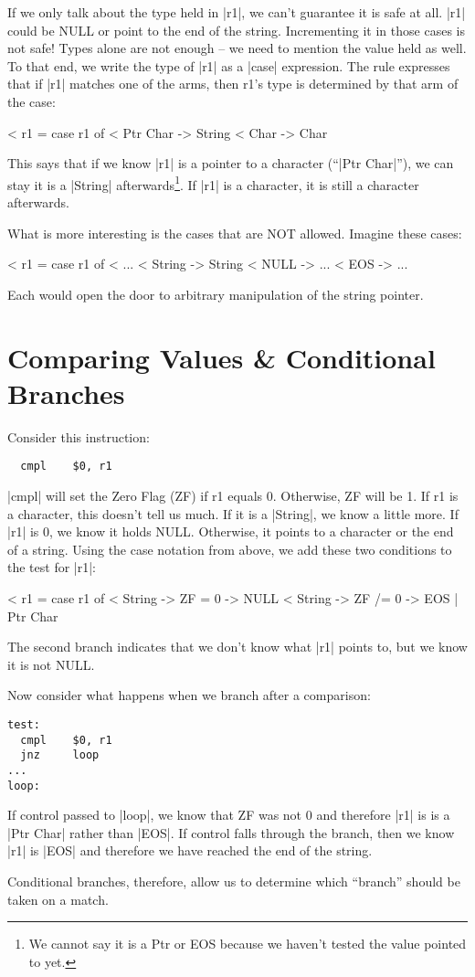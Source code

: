 \documentclass[11pt]{article}
\begin{document}
If we only talk about the type held in |r1|, we can't guarantee it is
safe at all. |r1| could be NULL or point to the end of the
string. Incrementing it in those cases is not safe! Types alone are
not enough -- we need to mention the value held as well. To that end,
we write the type of |r1| as a |case| expression. The rule expresses that
if |r1| matches one of the arms, then r1's type is determined by that
arm of the case:

< r1 = case r1 of 
<   Ptr Char -> String 
<   Char -> Char

This says that if we know |r1| is a pointer to a character (``|Ptr
Char|''), we can stay it is a |String| afterwards\footnote{We cannot
  say it is a Ptr or EOS because we haven't tested the value pointed
  to yet.}. If |r1| is a character, it is still a character
afterwards.

What is more interesting is the cases that are NOT allowed. Imagine these cases:

< r1 = case r1 of 
<   ...
<   String -> String
<   NULL -> ...
<   EOS -> ...

Each would open the door to arbitrary manipulation of the string pointer.

\section*{Comparing Values \& Conditional Branches}

Consider this instruction:

\begin{verbatim}
  cmpl    $0, r1
\end{verbatim}

|cmpl| will set the Zero Flag (ZF) if r1 equals 0. Otherwise, ZF will
be 1. If r1 is a character, this doesn't tell us much. If it is a
|String|, we know a little more. If |r1| is 0, we know it holds
NULL. Otherwise, it points to a character or the end of a string. Using
the case notation from above, we add these two conditions to the test
for |r1|:

< r1 = case r1 of
<   String -> ZF = 0 -> NULL
<   String -> ZF /= 0 -> {EOS | Ptr Char}

The second branch indicates that we don't know what |r1| points to,
but we know it is not NULL.

Now consider what happens when we branch after a comparison:

\begin{verbatim}
test:   
  cmpl    $0, r1
  jnz     loop
...
loop:   
\end{verbatim}

If control passed to |loop|, we know that ZF was not 0 and therefore
|r1| is is a |Ptr Char| rather than |EOS|. If control falls through the
branch, then we know |r1| is |EOS| and therefore we have reached
the end of the string. 

Conditional branches, therefore, allow us to determine which ``branch'' should
be taken on a match. 
\end{document}
